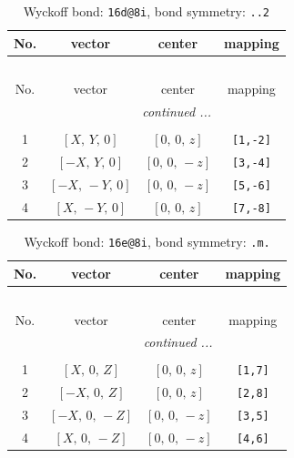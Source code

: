 \documentclass[fleqn,8pt]{jsarticle}
\begin{document}
\begin{longtable}{cccc}
\caption{Wyckoff bond: {\tt 16d@8i}, bond symmetry: {\tt ..2}}
 \\
 \hline \hline
No. & vector & center & mapping \\ \hline \endfirsthead

\multicolumn{3}{l}{\tablename\ \thetable{}} \\
 \hline \hline
No. & vector & center & mapping \\ \hline \endhead

 \hline \hline
\multicolumn{3}{r}{\footnotesize\it continued ...} \\ \endfoot

 \hline \hline
\multicolumn{3}{r}{} \\ \endlastfoot

1 & $\left[ X,\, Y,\, 0 \right]$ & $\left[ 0,\, 0,\, z \right]$ & {\tt [1,-2]} \\ \hline
2 & $\left[ - X,\, Y,\, 0 \right]$ & $\left[ 0,\, 0,\, - z \right]$ & {\tt [3,-4]} \\ \hline
3 & $\left[ - X,\, - Y,\, 0 \right]$ & $\left[ 0,\, 0,\, - z \right]$ & {\tt [5,-6]} \\ \hline
4 & $\left[ X,\, - Y,\, 0 \right]$ & $\left[ 0,\, 0,\, z \right]$ & {\tt [7,-8]} \\
\end{longtable}
\renewcommand{\arraystretch}{1.2}
\begin{longtable}{cccc}
\caption{Wyckoff bond: {\tt 16e@8i}, bond symmetry: {\tt .m.}}
 \\
 \hline \hline
No. & vector & center & mapping \\ \hline \endfirsthead

\multicolumn{3}{l}{\tablename\ \thetable{}} \\
 \hline \hline
No. & vector & center & mapping \\ \hline \endhead

 \hline \hline
\multicolumn{3}{r}{\footnotesize\it continued ...} \\ \endfoot

 \hline \hline
\multicolumn{3}{r}{} \\ \endlastfoot

1 & $\left[ X,\, 0,\, Z \right]$ & $\left[ 0,\, 0,\, z \right]$ & {\tt [1,7]} \\ \hline
2 & $\left[ - X,\, 0,\, Z \right]$ & $\left[ 0,\, 0,\, z \right]$ & {\tt [2,8]} \\ \hline
3 & $\left[ - X,\, 0,\, - Z \right]$ & $\left[ 0,\, 0,\, - z \right]$ & {\tt [3,5]} \\ \hline
4 & $\left[ X,\, 0,\, - Z \right]$ & $\left[ 0,\, 0,\, - z \right]$ & {\tt [4,6]} \\
\end{longtable}
\end{document}
